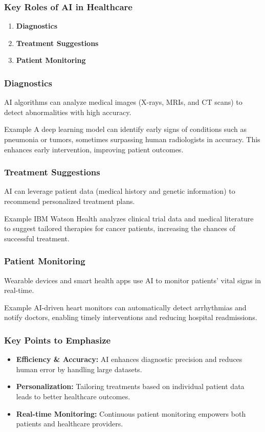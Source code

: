 \documentclass[aspectratio=169]{beamer}
\begin{document}
\begin{frame}[fragile]
    \frametitle{Key Roles of AI in Healthcare}
    \begin{enumerate}
        \item \textbf{Diagnostics}
        \item \textbf{Treatment Suggestions}
        \item \textbf{Patient Monitoring}
    \end{enumerate}
\end{frame}

\begin{frame}[fragile]
    \frametitle{Diagnostics}
    AI algorithms can analyze medical images (X-rays, MRIs, and CT scans) to detect abnormalities with high accuracy. 
    \begin{block}{Example}
        A deep learning model can identify early signs of conditions such as pneumonia or tumors, sometimes surpassing human radiologists in accuracy. This enhances early intervention, improving patient outcomes.
    \end{block}
\end{frame}

\begin{frame}[fragile]
    \frametitle{Treatment Suggestions}
    AI can leverage patient data (medical history and genetic information) to recommend personalized treatment plans.
    \begin{block}{Example}
        IBM Watson Health analyzes clinical trial data and medical literature to suggest tailored therapies for cancer patients, increasing the chances of successful treatment.
    \end{block}
\end{frame}

\begin{frame}[fragile]
    \frametitle{Patient Monitoring}
    Wearable devices and smart health apps use AI to monitor patients’ vital signs in real-time.
    \begin{block}{Example}
        AI-driven heart monitors can automatically detect arrhythmias and notify doctors, enabling timely interventions and reducing hospital readmissions.
    \end{block}
\end{frame}

\begin{frame}[fragile]
    \frametitle{Key Points to Emphasize}
    \begin{itemize}
        \item \textbf{Efficiency \& Accuracy:} AI enhances diagnostic precision and reduces human error by handling large datasets.
        \item \textbf{Personalization:} Tailoring treatments based on individual patient data leads to better healthcare outcomes.
        \item \textbf{Real-time Monitoring:} Continuous patient monitoring empowers both patients and healthcare providers.
    \end{itemize}
\end{frame}
\end{document}
